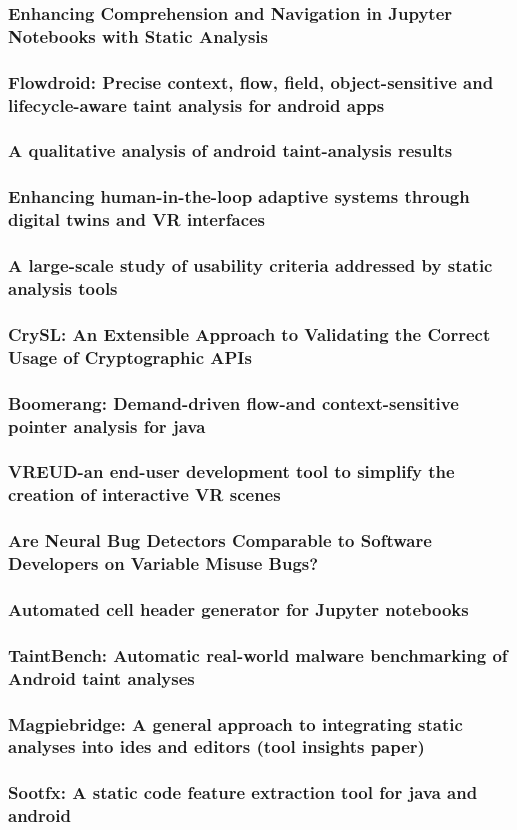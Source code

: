 \documentclass{beamer}
\begin{document}
\begin{frame}[plain]
\frametitle{Enhancing Comprehension and Navigation in Jupyter Notebooks with Static Analysis}
\end{frame}
\begin{frame}[plain]
\frametitle{Flowdroid: Precise context, flow, field, object-sensitive and lifecycle-aware taint analysis for android apps}
\end{frame}
\begin{frame}[plain]
\frametitle{A qualitative analysis of android taint-analysis results}
\end{frame}
\begin{frame}[plain]
\frametitle{Enhancing human-in-the-loop adaptive systems through digital twins and VR interfaces}
\end{frame}
\begin{frame}[plain]
\frametitle{A large-scale study of usability criteria addressed by static analysis tools}
\end{frame}
\begin{frame}[plain]
\frametitle{CrySL: An Extensible Approach to Validating the Correct Usage of Cryptographic APIs}
\end{frame}
\begin{frame}[plain]
\frametitle{Boomerang: Demand-driven flow-and context-sensitive pointer analysis for java}
\end{frame}
\begin{frame}[plain]
\frametitle{VREUD-an end-user development tool to simplify the creation of interactive VR scenes}
\end{frame}
\begin{frame}[plain]
\frametitle{Are Neural Bug Detectors Comparable to Software Developers on Variable Misuse Bugs?}
\end{frame}
\begin{frame}[plain]
\frametitle{Automated cell header generator for Jupyter notebooks}
\end{frame}
\begin{frame}[plain]
\frametitle{TaintBench: Automatic real-world malware benchmarking of Android taint analyses}
\end{frame}
\begin{frame}[plain]
\frametitle{Magpiebridge: A general approach to integrating static analyses into ides and editors (tool insights paper)}
\end{frame}
\begin{frame}[plain]
\frametitle{Sootfx: A static code feature extraction tool for java and android}
\end{frame}
\end{document}
